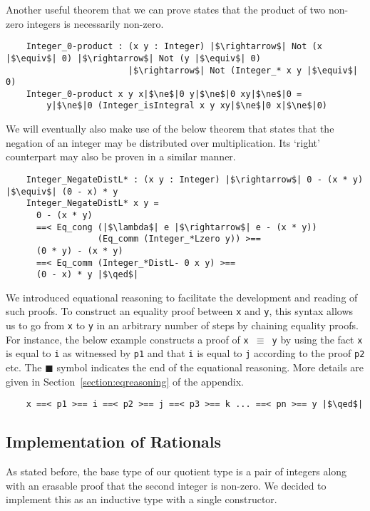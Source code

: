 \documentclass[12pt,twoside,maitrise]{dms}
\theoremstyle{definition}
\numberwithin{equation}{section}
\numberwithin{table}{chapter}
\numberwithin{figure}{chapter}
\newcommand\id[1] {\texttt{#1}}
\newcommand\fn[1] {\texttt{#1}}
\renewcommand\qed{\blacksquare}
\begin{document}
Another useful theorem that we can prove states that the product of two non-zero integers is necessarily non-zero.

\begin{verbatim}
    Integer_0-product : (x y : Integer) |$\rightarrow$| Not (x |$\equiv$| 0) |$\rightarrow$| Not (y |$\equiv$| 0)
                        |$\rightarrow$| Not (Integer_* x y |$\equiv$| 0)
    Integer_0-product x y x|$\ne$|0 y|$\ne$|0 xy|$\ne$|0 =
        y|$\ne$|0 (Integer_isIntegral x y xy|$\ne$|0 x|$\ne$|0)
\end{verbatim}

We will eventually also make use of the below theorem that states that the
negation of an integer may be distributed over multiplication. Its `right'
counterpart may also be proven in a similar manner.

\begin{verbatim}
    Integer_NegateDistL* : (x y : Integer) |$\rightarrow$| 0 - (x * y) |$\equiv$| (0 - x) * y
    Integer_NegateDistL* x y =
      0 - (x * y)
      ==< Eq_cong (|$\lambda$| e |$\rightarrow$| e - (x * y))
                  (Eq_comm (Integer_*Lzero y)) >==
      (0 * y) - (x * y)
      ==< Eq_comm (Integer_*DistL- 0 x y) >==
      (0 - x) * y |$\qed$|
\end{verbatim}

We introduced equational reasoning to facilitate the development and reading of
such proofs. To construct an equality proof between \id{x} and \id{y}, this
syntax allows us to go from \id{x} to \id{y} in an arbitrary number of steps by
chaining equality proofs. For instance, the below example constructs a proof
of \fn{x $\equiv$ y} by using the fact \id{x} is equal to \id{i} as witnessed by
\id{p1} and that \id{i} is equal to \id{j} according to the proof \id{p2} etc.
The $\qed$ symbol indicates the end of the equational reasoning. More details
are given in Section~\ref{section:eqreasoning} of the appendix.

\begin{verbatim}
    x ==< p1 >== i ==< p2 >== j ==< p3 >== k ... ==< pn >== y |$\qed$|
\end{verbatim}

\subsection*{Implementation of Rationals}
As stated before, the base type of our quotient type is a pair of integers along
with an erasable proof that the second integer is non-zero. We decided to
implement this as an inductive type with a single constructor.
\end{document}
